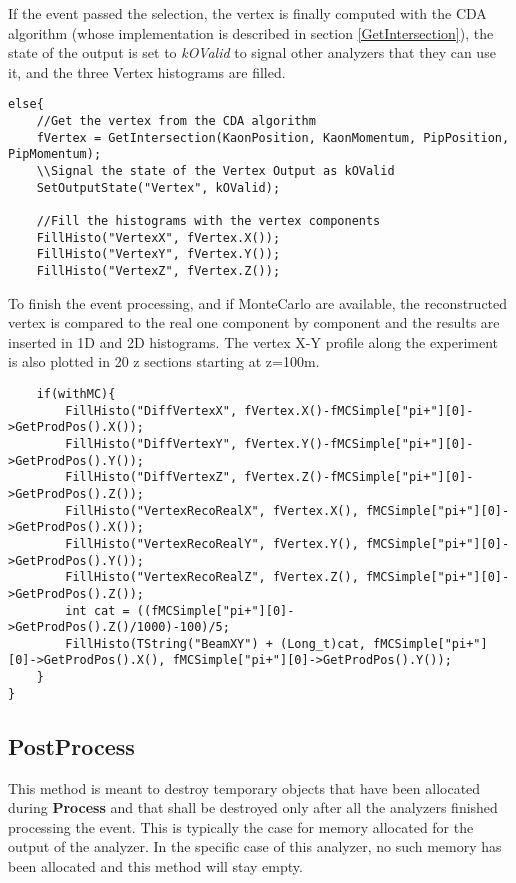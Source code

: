\documentclass{article}
\newcommand{\method}[1]{\textbf{#1}}
\newcommand{\var}[1]{\textit{#1}}
\begin{document}
If the event passed the selection, the vertex is finally computed with the CDA algorithm (whose
implementation is described in section \ref{GetIntersection}), the state of the output is set to
\var{kOValid} to signal other analyzers that they can use it, and the three Vertex histograms are
filled.

\begin{lstlisting}
else{
	//Get the vertex from the CDA algorithm
	fVertex = GetIntersection(KaonPosition, KaonMomentum, PipPosition, PipMomentum);
	\\Signal the state of the Vertex Output as kOValid
	SetOutputState("Vertex", kOValid);
	
	//Fill the histograms with the vertex components
	FillHisto("VertexX", fVertex.X());
	FillHisto("VertexY", fVertex.Y());
	FillHisto("VertexZ", fVertex.Z());
\end{lstlisting}

To finish the event processing, and if MonteCarlo are available, the reconstructed vertex is
compared to the real one component by component and the results are inserted in 1D and 2D
histograms. The vertex X-Y profile along the experiment is also plotted in 20 z sections starting
at z=100m.
\begin{lstlisting}
	if(withMC){
		FillHisto("DiffVertexX", fVertex.X()-fMCSimple["pi+"][0]->GetProdPos().X());
		FillHisto("DiffVertexY", fVertex.Y()-fMCSimple["pi+"][0]->GetProdPos().Y());
		FillHisto("DiffVertexZ", fVertex.Z()-fMCSimple["pi+"][0]->GetProdPos().Z());
		FillHisto("VertexRecoRealX", fVertex.X(), fMCSimple["pi+"][0]->GetProdPos().X());
		FillHisto("VertexRecoRealY", fVertex.Y(), fMCSimple["pi+"][0]->GetProdPos().Y());
		FillHisto("VertexRecoRealZ", fVertex.Z(), fMCSimple["pi+"][0]->GetProdPos().Z());
		int cat = ((fMCSimple["pi+"][0]->GetProdPos().Z()/1000)-100)/5;
		FillHisto(TString("BeamXY") + (Long_t)cat, fMCSimple["pi+"][0]->GetProdPos().X(), fMCSimple["pi+"][0]->GetProdPos().Y());
	}
}
\end{lstlisting}

\subsection{PostProcess}
This method is meant to destroy temporary objects that have been allocated during \method{Process}
and that shall be destroyed only after all the analyzers finished processing the event. This is
typically the case for memory allocated for the output of the analyzer. In the specific case of this
analyzer, no such memory has been allocated and this method will stay empty.
\end{document}

